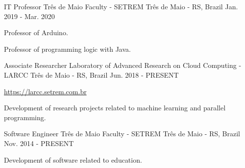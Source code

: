 
\begin{cventries}
	\cventry
	{IT Professor} %
	{Três de Maio Faculty - SETREM} %
	{Três de Maio - RS, Brazil} %
	{Jan. 2019 - Mar. 2020} %
	{
		\begin{cvitems} %
			\item {Professor of Arduino.}
			\item {Professor of programming logic with Java.}
		\end{cvitems}
	}

	\cventry
	{Associate Researcher} %
	{Laboratory of Advanced Research on Cloud Computing - LARCC} %
	{Três de Maio - RS, Brazil} %
	{Jun. 2018 - PRESENT} %
	{
		\begin{cvitems} %
			\item {\href{https://larcc.setrem.com.br}{https://larcc.setrem.com.br}}
			\item {Development of research projects related to machine learning and parallel programming.}
		\end{cvitems}
	}

	\cventry
	{Software Engineer} %
	{Três de Maio Faculty - SETREM} %
	{Três de Maio - RS, Brazil} %
	{Nov. 2014 - PRESENT} %
	{
		\begin{cvitems} %
			\item {Development of software related to education.}
		\end{cvitems}
	}
\end{cventries}
